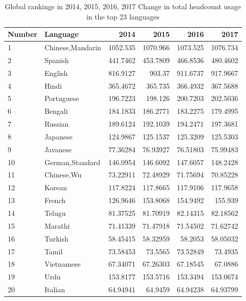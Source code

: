 \begin{table}[H]
	\centering
	\caption{Global rankings in 2014, 2015, 2016, 2017 Change in total headcount usage in the top 23 languages}
	\begin{tabular}{llrrrr}
		\toprule
		\multicolumn{1}{l}{Number} & Language & 2014  & 2015  & 2016  & 2017 \\
		\midrule
		1     & Chinese,Mandarin & 1052.535 & 1070.966 & 1073.525 & 1076.734 \\
		2     & Spanish & 441.7462 & 453.7809 & 466.8536 & 480.4602 \\
		3     & English & 816.9127 & 903.37 & 911.6737 & 917.9667 \\
		4     & Hindi & 365.4672 & 365.735 & 366.4932 & 367.5688 \\
		5     & Portuguese & 196.7223 & 198.126 & 200.7203 & 202.5036 \\
		6     & Bengali & 184.1833 & 186.2771 & 183.2275 & 179.4995 \\
		7     & Russian & 189.6124 & 192.1039 & 194.2471 & 197.3681 \\
		8     & Japanese & 124.9867 & 125.1537 & 125.3209 & 125.5303 \\
		9     & Javanese & 77.36284 & 76.93927 & 76.51803 & 75.99483 \\
		10    & German,Standard & 146.0954 & 146.6092 & 147.6057 & 148.2428 \\
		11    & Chinese,Wu & 73.22911 & 72.48929 & 71.75694 & 70.85228 \\
		12    & Korean & 117.8224 & 117.8665 & 117.9106 & 117.9658 \\
		13    & French & 126.9646 & 153.8068 & 154.9492 & 155.939 \\
		14    & Telugu & 81.37525 & 81.70919 & 82.14315 & 82.18562 \\
		15    & Marathi & 71.41339 & 71.47918 & 71.54502 & 71.62742 \\
		16    & Turkish & 58.45415 & 58.32959 & 58.2053 & 58.05032 \\
		17    & Tamil & 73.58453 & 73.5565 & 73.52849 & 73.4935 \\
		18    & Vietnamese & 67.34071 & 67.26303 & 67.18545 & 67.0886 \\
		19    & Urdu  & 153.8177 & 153.5716 & 153.3494 & 153.0674 \\
		20    & Italian & 64.94941 & 64.9459 & 64.94238 & 64.93799 \\
		\bottomrule
	\end{tabular}%
	\label{tab:addlabel}%
\end{table}%

